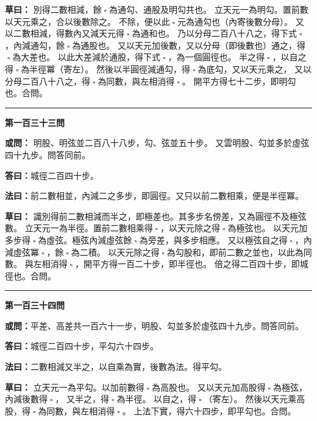 \documentclass[11pt,a4paper]{article}
\let\origsquare\square
\renewcommand{\square}{\ensuremath{\origsquare}}%
\newcommand{\longline}{\noindent\rule{\textwidth}{0.4pt}}
\newcommand{\owen}[1]{%
  \par\vspace{0.4em}%
  \noindent\textcolor{problemcolor}{\textbf{或問：}}{\tradfont #1}\par\nopagebreak%
}
\newcommand{\fayue}[1]{%
  \par\noindent\textcolor{methodcolor}{\textbf{法曰：}}{\tradfont #1}\par\nopagebreak%
}
\newcommand{\tsaoyue}[1]{%
  \par\noindent\textcolor{workcolor}{\textbf{草曰：}}{\tradfont #1}\par%
}
\newcommand{\dayue}[1]{%
  \par\noindent\textcolor{anscolor}{\textbf{答曰：}}{\tradfont #1}\par\nopagebreak%
}
\newcommand{\wen}[1]{\par\vspace{0.3em}\noindent\textcolor{problemcolor}{\textbf{第#1問}}\par}
\begin{document}
\tsaoyue{%
別得二數相減，餘$ \; \square \; $為通勾、通股及明勾共也。
立天元一為明勾。置前數以天元乘之，合以後數除之。
不除，便以此$ \; \square \; $元為通勾也（內寄後數分母）。
又以二數相減，得數內又減天元得$ \; \square \; $為通和也。
乃以分母二百八十八之，得下式$ \; \square \; $，內減通勾，餘$ \; \square \; $為通股也。
又以天元加後數，又以分母（即後數也）通之，得$ \; \square \; $為大差也。
以此大差減於通股，得下式$ \; \square \; $，為一個圓徑也。
半之得$ \; \square \; $，以自之得$ \; \square \; $為半徑冪（寄左）。
然後以半圓徑減通勾，得$ \; \square \; $為底勾，又以天元乘之，
又以分母二百八十八之，得$ \; \square \; $為同數，與左相消得$ \; \square \; $。
開平方得七十二步，即明勾也。合問。}

\vspace{0.5cm}
\begin{center}
\longline
\end{center}

\wen{一百三十三}
\owen{%
明股、明弦並二百八十八步，勾、弦並五十步。
又雲明股、勾並多於虛弦四十九步。問答同前。}
\dayue{城徑二百四十步。}

\fayue{前二數相並，內減二之多步，即圓徑。又只以前二數相乘，便是半徑冪。}

\tsaoyue{%
識別得前二數相減而半之，即極差也。其多步名傍差，又為圓徑不及極弦數。
立天元一為半徑。置前二數相乘得$ \; \square \; $，以天元除之得$ \; \square \; $為極弦也。
以天元加多步得$ \; \square \; $為虛弦。極弦內減虛弦餘$ \; \square \; $為旁差，與多步相應。
又以極弦自之得$ \; \square \; $，內減虛弦冪$ \; \square \; $，餘$ \; \square \; $為二積。
以天元除之得$ \; \square \; $為勾股和，即前二數之並也，以此為同數。
與左相消得$ \; \square \; $，開平方得一百二十步，即半徑也。
倍之得二百四十步，即城徑也。合問。}

\vspace{0.5cm}
\begin{center}
\longline
\end{center}

\wen{一百三十四}
\owen{平差、高差共一百六十一步，明股、勾並多於虛弦四十九步。問答同前。}
\dayue{城徑二百四十步，平勾六十四步。}

\fayue{二數相減又半之，以自乘為實，後數為法。得平勾。}

\tsaoyue{%
立天元一為平勾。以加前數得$ \; \square \; $為高股也。
又以天元加高股得$ \; \square \; $為極弦，內減後數得$ \; \square \; $，
又半之，得$ \; \square \; $為半徑。
以自之，得$ \; \square \; $（寄左）。
然後以天元乘高股，得$ \; \square \; $為同數，與左相消得$ \; \square \; $。
上法下實，得六十四步，即平勾也。合問。}
\end{document}
